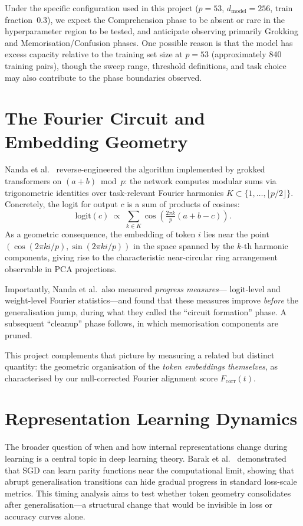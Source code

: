 \documentclass[12pt,openany,a4paper]{book}
\newcommand{\fcorr}{F_{\mathrm{corr}}}
\begin{document}
Under the specific configuration used in this project ($p=53$,
$d_{\mathrm{model}}=256$, train fraction~$0.3$), we expect
the Comprehension phase to be absent or rare in the hyperparameter
region to be tested, and anticipate observing primarily Grokking
and Memorisation/Confusion phases.
One possible reason is that the model has excess capacity relative
to the training set size at $p=53$ (approximately 840 training
pairs), though the sweep range, threshold definitions, and task
choice may also contribute to the phase boundaries observed.

\section{The Fourier Circuit and Embedding Geometry}

Nanda et al.\ \cite{nanda2023progress} reverse-engineered the
algorithm implemented by grokked transformers on $(a+b)\bmod p$:
the network computes modular sums via trigonometric identities
over task-relevant Fourier harmonics $K\subset\{1,\dots,\lfloor
p/2\rfloor\}$.
Concretely, the logit for output $c$ is a sum of products of cosines:
\[
  \mathrm{logit}(c) \;\propto\; \sum_{k\in K}
    \cos\!\left(\tfrac{2\pi k}{p}(a+b-c)\right).
\]
As a geometric consequence, the embedding of token $i$ lies near
the point $(\cos(2\pi ki/p),\sin(2\pi ki/p))$ in the space spanned
by the $k$-th harmonic components, giving rise to the characteristic
near-circular ring arrangement observable in PCA projections.

Importantly, Nanda et al.\ also measured \emph{progress measures}---
logit-level and weight-level Fourier statistics---and found that these
measures improve \emph{before} the generalisation jump, during what
they called the ``circuit formation'' phase.
A subsequent ``cleanup'' phase follows, in which memorisation
components are pruned.

This project complements that picture by measuring a
related but distinct quantity: the geometric organisation of the
\emph{token embeddings themselves}, as characterised by our
null-corrected Fourier alignment score $\fcorr(t)$.

\section{Representation Learning Dynamics}

The broader question of when and how internal representations change
during learning is a central topic in deep learning theory.
Barak et al.\ \cite{barak2022hidden} demonstrated that SGD can learn
parity functions near the computational limit, showing that abrupt
generalisation transitions can hide gradual progress in standard
loss-scale metrics.
This timing analysis aims to test whether token geometry consolidates
after generalisation---a structural change that would be invisible
in loss or accuracy curves alone.
\end{document}
